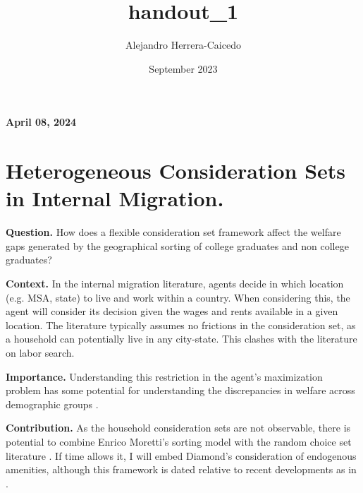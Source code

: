\documentclass[11pt]{article}
\title{handout_1}
\author{Alejandro Herrera-Caicedo}
\date{September 2023}
\begin{document}
	
	
	

\begin{center}
	\large\textbf{}
\end{center}
\renewcommand\labelitemi{--}



\begin{center}
\Large {\textbf{April 08, 2024}}\vspace{3pt}\\
\end{center}




\section{Heterogeneous Consideration Sets in Internal Migration.}  

\textbf{Question.} How does a flexible consideration set framework affect the welfare gaps generated by the geographical sorting of college graduates and non college graduates? 

\textbf{Context.} In the internal migration literature, agents decide in which location (e.g. MSA, state) to live and work within a country. When considering this, the agent will consider its decision given the wages and rents available in a given location. The literature typically assumes no frictions in the consideration set, as a household can potentially live in any city-state. This clashes with the literature on labor search. 

\textbf{Importance.} Understanding this restriction in the agent's maximization problem has some potential for understanding the discrepancies in welfare across demographic groups \cite{diamond2016determinants,moretti2013real}. 

\textbf{Contribution.} As the household consideration sets are not observable, there is potential to combine Enrico Moretti's sorting model with the random choice set literature \cite{barseghyan2021heterogeneous}. If time allows it, I will embed Diamond's consideration of endogenous amenities, although this framework is dated relative to recent developments as in \citeauthor{almagro2022location} \citeyear{almagro2022location}.
\end{document}

